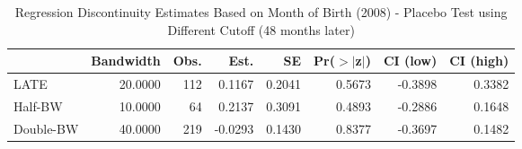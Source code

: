 \begin{table}[ht]
\centering
\begin{tabular}{lrrrrrrr}
  \hline
 & Bandwidth & Obs. & Est. & SE & Pr($>$$|$z$|$) & CI (low) & CI (high) \\ 
  \hline
LATE & 20.0000 & 112 & 0.1167 & 0.2041 & 0.5673 & -0.3898 & 0.3382 \\ 
  Half-BW & 10.0000 & 64 & 0.2137 & 0.3091 & 0.4893 & -0.2886 & 0.1648 \\ 
  Double-BW & 40.0000 & 219 & -0.0293 & 0.1430 & 0.8377 & -0.3697 & 0.1482 \\ 
   \hline
\end{tabular}
\caption{Regression Discontinuity Estimates Based on Month of Birth (2008) - Placebo Test using Different Cutoff (48 months later)} 
\label{tab:rd2008m_plac}
\end{table}
